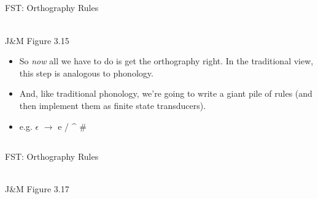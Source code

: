 \documentclass[9pt,xcolor=pdftex,dvipsnames,table]{beamer}
\begin{document}
\subsection{}
\begin{frame}{FST: Orthography Rules}
\begin{center}
	\\
	{\large J\&M Figure 3.15}\\
\end{center}
\vspace{.5cm}
\begin{itemize}
     \item So \emph{now} all we have to do is get the orthography right.  In the traditional view, this step is analogous to phonology.
     \item And, like traditional phonology, we're going to write a giant pile of rules (and then implement them as finite state transducers).
     \item e.g. $\epsilon$ $\rightarrow$ e / \^{} \underline{\hspace*{0.25cm}} \# 
\end{itemize}
\end{frame}

\subsection{}
\begin{frame}{FST: Orthography Rules}
\begin{center}
	\\
	{\large J\&M Figure 3.17}\\
\end{center}
\end{frame}
\end{document}
